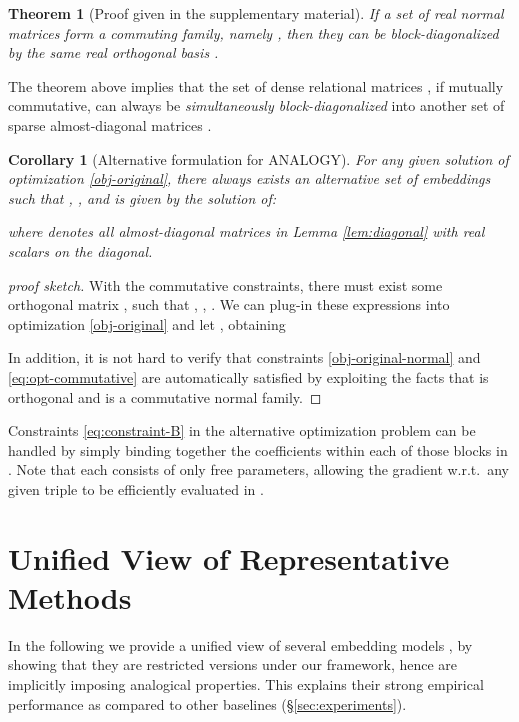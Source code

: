 \documentclass{article}
\newtheorem{theorem}{Theorem}[section]
\newtheorem{corollary}{Corollary}[theorem]
\begin{document}
\begin{theorem}
[Proof given in the supplementary material]
    If a set of real normal matrices  form a commuting family,
    namely
    ,
    then they can be block-diagonalized by the same real orthogonal basis .
\label{thm:commutativity}
\end{theorem}
The theorem above implies that the set of dense relational matrices ,
if mutually commutative,
can always be \emph{simultaneously block-diagonalized}
into another set of sparse almost-diagonal matrices .
\begin{corollary}[Alternative formulation for ANALOGY]
    For any given solution  of optimization \eqref{obj-original},
    there always exists an alternative set of embeddings 
    such that ,
    ,
    and  is given by the solution of:
    
    where  denotes all  almost-diagonal matrices 
    in Lemma \ref{lem:diagonal} with  real scalars on the diagonal.
    \label{coro:alternative}
\end{corollary}

\begin{proof}[proof sketch]
    With the commutative constraints,
    there must exist some orthogonal matrix ,
    such that
    , , .
    We can plug-in these expressions into optimization \eqref{obj-original}
    and let ,
    obtaining

In addition, it is not hard to verify that constraints \eqref{obj-original-normal} and \eqref{eq:opt-commutative}
are automatically satisfied by exploiting the facts that  is orthogonal and  is a commutative normal family.
\end{proof}

Constraints \eqref{eq:constraint-B} in the alternative optimization problem
can be handled by simply binding together the coefficients within each of those  blocks in .
Note that each  consists of only  free parameters,
allowing the gradient w.r.t.\ any given triple to be efficiently evaluated in .


 \section{Unified View of Representative Methods}
\label{sec:unifiedview}
In the following we provide a unified view of several embedding models
\cite{DBLP:journals/corr/YangYHGD14a, DBLP:conf/icml/TrouillonWRGB16, DBLP:conf/aaai/NickelRP16},
by showing that they are restricted versions under our framework,
hence are implicitly imposing analogical properties.
This explains their strong empirical performance as compared to other baselines (\S \ref{sec:experiments}).
\end{document}

